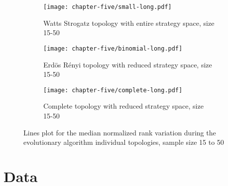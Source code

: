 \begin{figure}[H]
	\centering
\begin{subfigure}[H]{0.45\textwidth}
  \centering
  \texttt{[image: chapter-five/small-long.pdf]}
  \caption{Watts Strogatz topology with entire strategy space, size 15-50}
\end{subfigure}
\hfill
  \begin{subfigure}[H]{0.45\textwidth}
    \centering
    \texttt{[image: chapter-five/binomial-long.pdf]}
    \caption{Erd\"{o}s R\'{e}nyi topology with reduced strategy space, size 15-50}
  \end{subfigure}
  \hfill
  \begin{subfigure}[H]{0.45\textwidth}
    \centering
    \texttt{[image: chapter-five/complete-long.pdf]}
    \caption{Complete topology with reduced strategy space, size 15-50}
  \end{subfigure}
	\caption{Lines plot for the median normalized rank variation during the evolutionary algorithm
           individual topologies, sample size 15 to 50}
	\label{fig:line-plots-individuals-all-long}
\end{figure}

\chapter{Data}

